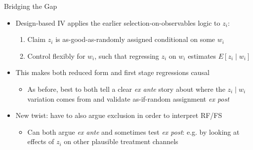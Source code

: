 \documentclass[11pt,english]{beamer}
\begin{document}
\begin{frame}{Bridging the Gap}
\begin{itemize}
\item Design-based IV applies the earlier selection-on-observables logic to $z_i$:\smallskip 

\begin{enumerate}
\item Claim $z_i$ is as-good-as-randomly assigned conditional on some $w_i$\smallskip\pause{}
\item Control flexibly for $w_i$, such that regressing $z_i$ on $w_i$ estimates $E[z_i\mid w_i]$
\end{enumerate}\bigskip\pause{}
\item This makes both reduced form and first stage regressions causal \smallskip\pause{}
\begin{itemize}
\item As before, best to both tell a clear \emph{ex ante} story about where the $z_i\mid w_i$ variation comes from and validate as-if-random assignment \emph{ex post}
\end{itemize}\bigskip\pause{}
\item New twist: have to also argue exclusion in order to interpret RF/FS\smallskip
\begin{itemize}
\item Can both argue \emph{ex ante} and sometimes test \emph{ex post}: e.g. by looking at effects of $z_i$ on other plausible treatment channels 
\end{itemize}
\end{itemize}


\end{frame}
\end{document}
